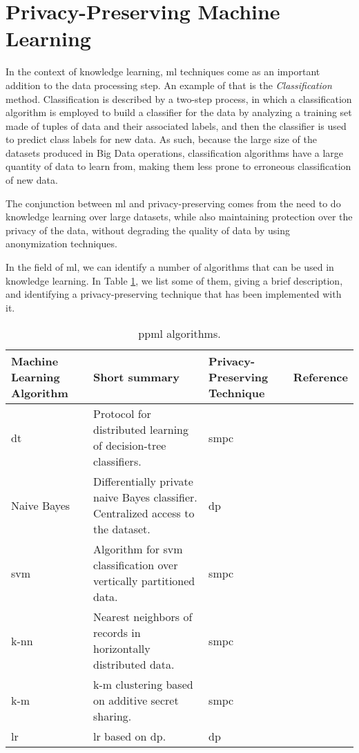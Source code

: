 \section{Privacy-Preserving Machine Learning}
\label{sec:PrivacyPreservingMachineLearning}


In the context of knowledge learning, \ac{ml} techniques come as an important addition to the data processing step. An example of that is the \textit{Classification} method. Classification is described by a two-step process, in which a classification algorithm is employed to build a classifier for the data by analyzing a training set made of tuples of data and their associated labels, and then the classifier is used to predict class labels for new data. As such, because the large size of the datasets produced in Big Data operations, classification algorithms have a large quantity of data to learn from, making them less prone to erroneous classification of new data.

The conjunction between \ac{ml} and privacy-preserving comes from the need to do knowledge learning over large datasets, while also maintaining protection over the privacy of the data, without degrading the quality of data by using anonymization techniques.

In the field of \ac{ml}, we can identify a number of algorithms that can be used in knowledge learning. In Table \ref{table:ppml1}, we list some of them, giving a brief description, and identifying a privacy-preserving technique that has been implemented with it.

\begin{table}[H]
\centering
\caption{\ac{ppml} algorithms.}
\label{table:ppml1}
\begin{tabular}{|p{2.3cm}|p{5cm}|p{3.7cm}|l|}
\hline
\textbf{Machine Learning Algorithm} & \textbf{Short summary} & \textbf{Privacy-Preserving Technique} 
& \textbf{Reference} \\ \hline
\acs{dt} & Protocol for distributed learning of decision-tree classifiers. & \ac{smpc} & \cite{brickell2009privacy} \\ \hline
Naive Bayes & Differentially private naive Bayes classifier. Centralized access to the dataset. & \ac{dp} &\cite{vaidya2013differentially} \\ \hline
\acs{svm}  &Algorithm for \acl{svm} classification over vertically partitioned data. & \ac{smpc} & \cite{yu2006privacy} \\ \hline
\acs{k-nn}  & Nearest neighbors of records in horizontally distributed data. & \ac{smpc}  & \cite{shaneck2006privacy} \\ \hline
\acs{k-m} & \acl{k-m} clustering based on additive secret sharing. & \ac{smpc}  & \cite{doganay2008distributed} \\\hline
\acs{lr} & \acl{lr} based on \acl{dp}.    &  \ac{dp} & \cite{chaudhuri2009privacy} \\\hline
\end{tabular}
\end{table}


